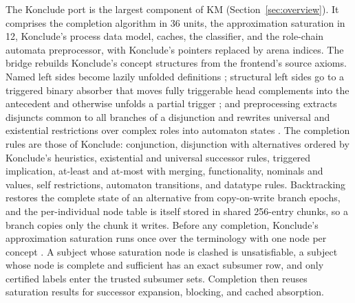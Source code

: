 The Konclude port is the largest component of KM (Section~\ref{sec:overview}). It comprises the completion
algorithm in 36 units, the approximation saturation in 12, Konclude's process
data model, caches, the classifier, and the role-chain automata
preprocessor, with Konclude's pointers replaced by arena indices.  The bridge
rebuilds Konclude's concept structures from the frontend's source axioms.
Named left sides become lazily unfolded definitions \cite{horrocks2000axioms};
structural left sides go to a triggered binary absorber that moves fully
triggerable head complements into the antecedent and otherwise unfolds a
partial trigger \cite{hudek2006binary,steigmiller2014absorption}; and
preprocessing extracts disjuncts common to all branches of a disjunction and
rewrites universal and existential restrictions over complex roles into
automaton states \cite{horrocks2006sroiq}.  The completion rules are those of
Konclude: conjunction, disjunction with alternatives ordered by Konclude's
heuristics, existential and universal successor rules, triggered implication,
at-least and at-most with merging, functionality, nominals and values, self
restrictions, automaton transitions, and datatype rules.  Backtracking restores
the complete state of an alternative from copy-on-write branch epochs, and the per-individual node table is itself stored in shared 256-entry
chunks, so a branch copies only the chunk it writes.  Before any completion,
Konclude's approximation saturation runs once over the terminology with one
node per concept \cite{steigmiller2014coupling,steigmiller2015payg}.  A subject
whose saturation node is clashed is unsatisfiable, a subject whose node is
complete and sufficient has an exact subsumer row, and only certified labels
enter the trusted subsumer sets.  Completion then reuses saturation results
for successor expansion, blocking, and cached absorption.

